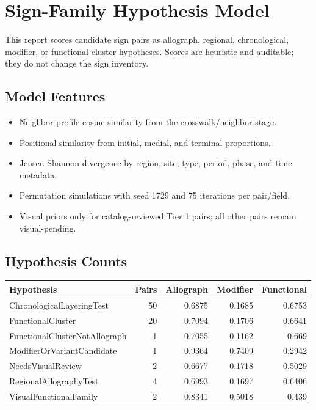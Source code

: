 ﻿\documentclass[11pt,a4paper]{article}
\begin{document}
\section*{Sign-Family Hypothesis Model}
This report scores candidate sign pairs as allograph, regional, chronological, modifier, or functional-cluster hypotheses. Scores are heuristic and auditable; they do not change the sign inventory.
\subsection*{Model Features}
\begin{itemize}
\item Neighbor-profile cosine similarity from the crosswalk/neighbor stage.
\item Positional similarity from initial, medial, and terminal proportions.
\item Jensen-Shannon divergence by region, site, type, period, phase, and time metadata.
\item Permutation simulations with seed 1729 and 75 iterations per pair/field.
\item Visual priors only for catalog-reviewed Tier 1 pairs; all other pairs remain visual-pending.
\end{itemize}
\subsection*{Hypothesis Counts}
\begin{center}
\begin{tabular}{lrrrr}
\toprule
\textbf{Hypothesis} & \textbf{Pairs} & \textbf{Allograph} & \textbf{Modifier} & \textbf{Functional} \\
\midrule
ChronologicalLayeringTest & 50 & 0.6875 & 0.1685 & 0.6753 \\
FunctionalCluster & 20 & 0.7094 & 0.1706 & 0.6641 \\
FunctionalClusterNotAllograph & 1 & 0.7055 & 0.1162 & 0.669 \\
ModifierOrVariantCandidate & 1 & 0.9364 & 0.7409 & 0.2942 \\
NeedsVisualReview & 2 & 0.6677 & 0.1718 & 0.5029 \\
RegionalAllographyTest & 4 & 0.6993 & 0.1697 & 0.6406 \\
VisualFunctionalFamily & 2 & 0.8341 & 0.5018 & 0.439 \\
\bottomrule
\end{tabular}
\end{center}
\end{document}
